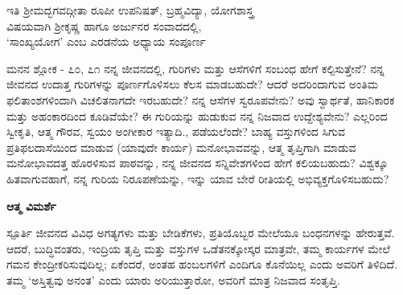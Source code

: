 \begin{center}
{\color{black}
ಇತಿ ಶ್ರೀಮದ್ಭಗವದ್ಗೀತಾ  ರೂಪೀ ಉಪನಿಷತ್, ಬ್ರಹ್ಮವಿದ್ಯಾ, ಯೋಗಶಾಸ್ತ್ರ\\ ವಿಷಯವಾಗಿ ಶ್ರೀಕೃಷ್ಣ ಹಾಗೂ ಅರ್ಜುನರ ಸಂವಾದದಲ್ಲಿ, \\‘ಸಾಂಖ್ಯಯೋಗ’ ಎಂಬ ಎರಡನೆಯ ಅಧ್ಯಾಯ  ಸಂಪೂರ್ಣ}
\end{center}

\newpage
\begin{mananam}{\mananamfont \large \large {ಮನನ ಶ್ಲೋಕ - ೭೦, ೭೧}}
\footnotesize \mananamtext ನನ್ನ ಜೀವನದಲ್ಲಿ, ಗುರಿಗಳು ಮತ್ತು ಆಸೆಗಳಿಗೆ ಸಂಬಂಧ ಹೇಗೆ ಕಲ್ಪಿಸುತ್ತೇನೆ? ನನ್ನ ಜೀವನದ ಉದಾತ್ತ   ಗುರಿಗಳನ್ನು ಪೂರ್ಣಗೊಳಿಸಲು ಕೆಲಸ ಮಾಡಬಹುದೇ? ಆದರೆ ಅದರಿಂದಾಗುವ ಅಂತಿಮ ಫಲಿತಾಂಶಗಳಿಂದಾಗಿ ವಿಚಲಿತನಾಗದೇ ಇರಬಹುದೇ? ನನ್ನ ಆಸೆಗಳ ಸ್ವರೂಪವೇನು? ಅವು ಸ್ವಾರ್ಥತೆ, ಹಾನಿಕಾರಕ ಮತ್ತು ಅಹಂಕಾರದಿಂದ ಕೂಡಿವೆಯೇ? ಈ ಗುರಿಯನ್ನು ಹುಡುಕುವ ನನ್ನ ನಿಜವಾದ ಉದ್ದೇಶ್ಯವೇನು? ಎಲ್ಲರಿಂದ ಸ್ವೀಕೃತಿ, ಆತ್ಮ ಗೌರವ, ಸ್ವಯಂ  ಅಂಗೀಕಾರ ಇತ್ಯಾದಿ., ಪಡೆಯಲೆಂದೇ?  ಬಾಹ್ಯ ವಸ್ತುಗಳಿಂದ ಸಿಗುವ ಪ್ರತಿಫಲದಾಸೆಯಿಂದ ಮಾಡುವ (ಯಾವುದೇ ಕಾರ್ಯ) ಮನೋಭಾವವನ್ನು, ಆತ್ಮ ತೃಪ್ತಿಗಾಗಿ ಮಾಡುವ ಮನೋಭಾವದತ್ತ ಹೊರಳಿಸುವ ಪಾಠವನ್ನು, ನನ್ನ ಜೀವನದ ಸನ್ನಿವೇಶಗಳಿಂದ ಹೇಗೆ ಕಲಿಯಬಹುದು? ವಿಶ್ವಕ್ಕೂ ಹಿತವಾಗುವಹಾಗೆ, ನನ್ನ ಗುರಿಯ ನಿರೂಪಣೆಯನ್ನು, ಇನ್ನು ಯಾವ ಬೇರೆ ರೀತಿಯಲ್ಲಿ  ಅಭಿವ್ಯಕ್ತಗೊಳಿಸಬಹುದು? 
\end{mananam}
\WritingHand\enspace\textbf{ಆತ್ಮ ವಿಮರ್ಶೆ}
\begin{inspiration}{\mananamfont \large \large ಸ್ಪೂರ್ತಿ}
\footnotesize \mananamtext ಜೀವನದ ವಿವಿಧ ಅಗತ್ಯಗಳು ಮತ್ತು ಬೇಡಿಕೆಗಳು, ಪ್ರತಿಯೊಬ್ಬರ ಮೇಲೆಯೂ ಬಂಧನಗಳನ್ನು ಹೇರುತ್ತವೆ. ಆದರೆ, ಬುದ್ಧಿವಂತರು, ಇಂದ್ರಿಯ ತೃಪ್ತಿ ಮತ್ತು ವಸ್ತುಗಳ ಒಡೆತನಕ್ಕೋಸ್ಕರ  ಮಾತ್ರವೇ, ತಮ್ಮ ಕಾರ್ಯಗಳ ಮೇಲೆ ಗಮನ ಕೇಂದ್ರೀಕರಿಸುವುದಿಲ್ಲ; ಏಕೆಂದರೆ,  ಅಂತಹ ಹಂಬಲಗಳಿಗೆ ಎಂದಿಗೂ ಕೊನೆಯಿಲ್ಲ ಎಂದು ಅವರಿಗೆ ತಿಳಿದಿದೆ.
 ತಮ್ಮ ‘ಅಸ್ತಿತ್ವವು ಅನಂತ’ ಎಂದು ಯಾರು ಅರಿಯುತ್ತಾರೋ, ಅವರಿಗೆ ಮಾತ್ರ ನಿಜವಾದ ಸಂತೃಪ್ತಿ.
\end{inspiration}
